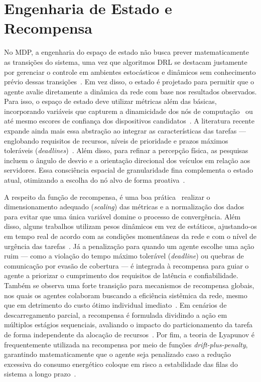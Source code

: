 \section*{Engenharia de Estado e Recompensa}
No \gls{MDP}, a engenharia do espaço de estado não busca prever matematicamente as transições do sistema, uma vez que algoritmos \gls{DRL} se destacam justamente por gerenciar o controle em ambientes estocásticos e dinâmicos sem conhecimento prévio dessas transições~\cite{fan2024}. Em vez disso, o estado é projetado para permitir que o agente avalie diretamente a dinâmica da rede com base nos resultados observados. Para isso, o espaço de estado deve utilizar métricas além das básicas, incorporando variáveis que capturem a dinamicidade dos nós de computação~\cite{kumar2023} ou até mesmo escores de confiança dos dispositivos candidatos~\cite{baker2024}. A literatura recente expande ainda mais essa abstração ao integrar as características das tarefas --- englobando requisitos de recursos, níveis de prioridade e prazos máximos toleráveis (\textit{deadlines})~\cite{fan2024, wei2024}. Além disso, para refinar a percepção física, as pesquisas incluem o ângulo de desvio e a orientação direcional dos veículos em relação aos servidores. Essa consciência espacial de granularidade fina complementa o estado atual, otimizando a escolha do nó alvo de forma proativa~\cite{farimani2024}.

A respeito da função de recompensa, é uma boa prática~\cite{sutton2018} realizar o dimensionamento adequado (\textit{scaling}) das métricas e a normalização dos dados para evitar que uma única variável domine o processo de convergência. Além disso, alguns trabalhos utilizam pesos dinâmicos em vez de estáticos, ajustando-os em tempo real de acordo com as condições momentâneas da rede e com o nível de urgência das tarefas~\cite{kumari2025, fan2024, shi2023}. Já a penalização para quando um agente escolhe uma ação ruim --- como a violação do tempo máximo tolerável (\textit{deadline}) ou quebras de comunicação por evasão de cobertura --- é integrada à recompensa para guiar o agente a priorizar o cumprimento dos requisitos de latência e confiabilidade. Também se observa uma forte transição para mecanismos de recompensa globais, nos quais os agentes colaboram buscando a eficiência sistêmica da rede, mesmo que em detrimento do custo ótimo individual imediato~\cite{farimani2024}. Em cenários de descarregamento parcial, a recompensa é formulada dividindo a ação em múltiplos estágios sequenciais, avaliando o impacto do particionamento da tarefa de forma independente da alocação de recursos~\cite{tian2025}. Por fim, a teoria de Lyapunov é frequentemente utilizada na recompensa por meio de funções \textit{drift-plus-penalty}, garantindo matematicamente que o agente seja penalizado caso a redução excessiva do consumo energético coloque em risco a estabilidade das filas do sistema a longo prazo~\cite{kumar2023}.

